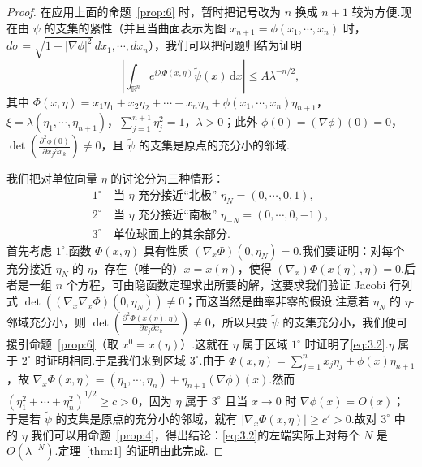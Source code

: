 \documentclass[
  BookTitleCN={傅里叶分析中的振动积分},
  BookTitleEN={Oscillatory Integrals in Fourier Analysis},
  OriginalAuthor={E.~M. Stein},
  OriginalEdition={Proc. Sympos. Pure Math. 35, Part~1},
  OriginalPublisher={American Mathematical Society},
  OriginalYear={1979},
  Translator={翻译及重排},
  ModelUsed={Codex CLI},
  Biblatex=false,
  TranslationDate={2026年8月27日}
]{mathtranslation}
\numberwithin{equation}{chapter}   %
\newcommand{\R}{\mathbb{R}}
\begin{document}
\begin{proof}
  在应用上面的命题~\ref{prop:6} 时，暂时把记号改为 $n$ 换成 $n+1$ 较为方便.现在由 $\psi$ 的支集的紧性（并且当曲面表示为图 $x_{n+1}=\phi(x_1,\cdots,x_n)$ 时，$d\sigma=\sqrt{1+|\nabla\phi|^{2}}\,dx_1,\cdots,dx_n$），我们可以把问题归结为证明
  \begin{equation}
    \left|\int_{\R^n}e^{i\lambda\Phi(x,\eta)}\tilde\psi(x)\,\mathrm{d}x\right|\leq A\lambda^{-n/2}, \label{eq:3.2}
  \end{equation}
  其中 $\Phi(x,\eta)=x_1\eta_1+x_2\eta_2+\cdots+x_n\eta_n+\phi(x_1,\cdots,x_n)\eta_{n+1}$，$\xi=\lambda(\eta_1,\cdots,\eta_{n+1})$，$\sum_{j=1}^{n+1}\eta_j^{2}=1$，$\lambda>0$；此外 $\phi(0)=(\nabla\phi)(0)=0$，$\det\left(\frac{\partial^{2}\phi(0)}{\partial x_j\partial x_k}\right)\neq0$，且 $\tilde\psi$ 的支集是原点的充分小的邻域.

  我们把对单位向量 $\eta$ 的讨论分为三种情形：
  \begin{align*}
    1^{\circ}&\ \text{当 }\eta\text{ 充分接近``北极'' }\eta_{N}=(0,\cdots,0,1),\\
    2^{\circ}&\ \text{当 }\eta\text{ 充分接近``南极'' }\eta_{-N}=(0,\cdots,0,-1),\\
    3^{\circ}&\ \text{单位球面上的其余部分.}
  \end{align*}
  首先考虑 $1^{\circ}$.函数 $\Phi(x,\eta)$ 具有性质 $(\nabla_{x}\Phi)(0,\eta_{N})=0$.我们要证明：对每个充分接近 $\eta_{N}$ 的 $\eta$，存在（唯一的）$x=x(\eta)$，使得 $(\nabla_{x})\Phi(x(\eta),\eta)=0$.后者是一组 $n$ 个方程，可由隐函数定理求出所要的解，这要求我们验证 Jacobi 行列式 $\det((\nabla_{x}\nabla_{x}\Phi)(0,\eta_{N}))\neq0$；而这当然是曲率非零的假设.注意若 $\eta_{N}$ 的 $\eta$-邻域充分小，则 $\det\left(\frac{\partial^{2}\Phi(x(\eta),\eta)}{\partial x_j\partial x_k}\right)\neq0$，所以只要 $\tilde\psi$ 的支集充分小，我们便可援引命题~\ref{prop:6}（取 $x^{0}=x(\eta)$）.这就在 $\eta$ 属于区域 $1^{\circ}$ 时证明了\eqref{eq:3.2}.$\eta$ 属于 $2^{\circ}$ 时证明相同.于是我们来到区域 $3^{\circ}$.由于 $\Phi(x,\eta)=\sum_{j=1}^{n}x_j\eta_j+\phi(x)\eta_{n+1}$，故 $\nabla_{x}\Phi(x,\eta)=(\eta_1,\cdots,\eta_n)+\eta_{n+1}(\nabla\phi)(x)$.然而 $(\eta_1^{2}+\cdots+\eta_n^{2})^{1/2}\geq c>0$，因为 $\eta$ 属于 $3^{\circ}$ 且当 $x\to0$ 时 $\nabla\phi(x)=O(x)$；于是若 $\tilde\psi$ 的支集是原点的充分小的邻域，就有 $|\nabla_{x}\Phi(x,\eta)|\geq c'>0$.故对 $3^{\circ}$ 中的 $\eta$ 我们可以用命题~\ref{prop:4}，得出结论：\eqref{eq:3.2}的左端实际上对每个 $N$ 是 $O(\lambda^{-N})$.定理~\ref{thm:1} 的证明由此完成.
\end{proof}
\end{document}
